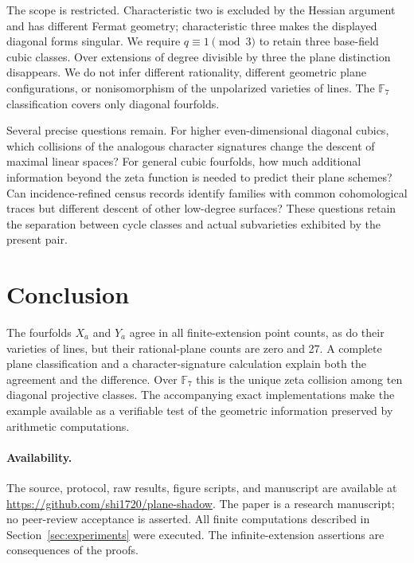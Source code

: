 \documentclass[11pt]{article}
\theoremstyle{remark}\newtheorem{remark}[theorem]{Remark}
\newcommand{\F}{\mathbb F}\newcommand{\PP}{\mathbb P}\newcommand{\Z}{\mathbb Z}
\begin{document}
The scope is restricted. Characteristic two is excluded by the Hessian argument and has different Fermat geometry; characteristic three makes the displayed diagonal forms singular. We require $q\equiv1\pmod3$ to retain three base-field cubic classes. Over extensions of degree divisible by three the plane distinction disappears. We do not infer different rationality, different geometric plane configurations, or nonisomorphism of the unpolarized varieties of lines. The $\F_7$ classification covers only diagonal fourfolds.

Several precise questions remain. For higher even-dimensional diagonal cubics, which collisions of the analogous character signatures change the descent of maximal linear spaces? For general cubic fourfolds, how much additional information beyond the zeta function is needed to predict their plane schemes? Can incidence-refined census records identify families with common cohomological traces but different descent of other low-degree surfaces? These questions retain the separation between cycle classes and actual subvarieties exhibited by the present pair.

\section{Conclusion}
The fourfolds $X_a$ and $Y_a$ agree in all finite-extension point counts, as do their varieties of lines, but their rational-plane counts are zero and 27. A complete plane classification and a character-signature calculation explain both the agreement and the difference. Over $\F_7$ this is the unique zeta collision among ten diagonal projective classes. The accompanying exact implementations make the example available as a verifiable test of the geometric information preserved by arithmetic computations.

\paragraph{Availability.}
The source, protocol, raw results, figure scripts, and manuscript are available at \url{https://github.com/shi1720/plane-shadow}. The paper is a research manuscript; no peer-review acceptance is asserted. All finite computations described in Section~\ref{sec:experiments} were executed. The infinite-extension assertions are consequences of the proofs.
\end{document}
